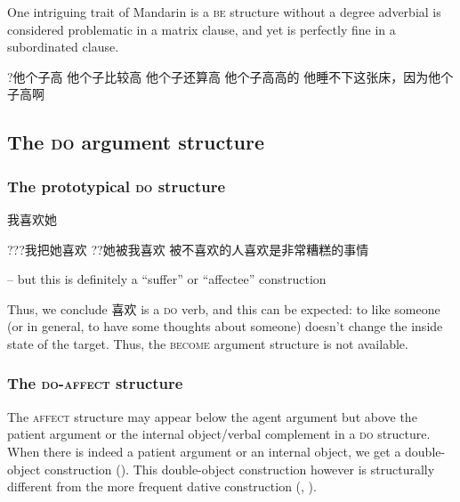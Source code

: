 \documentclass[UTF8, a4paper, oneside, scheme=plain, 12pt]{ctexrep}
\newcommand*{\category}[1]{\textsc{#1}}
\begin{document}
One intriguing trait of Mandarin is a \category{be} structure 
without a degree adverbial is considered problematic
in a matrix clause,
and yet is perfectly fine in a subordinated clause.

\begin{exe}
    \ex ?他个子高
    \ex 他个子比较高
    \ex 他个子还算高
    \ex 他个子高高的
    \ex 他睡不下这张床，因为他个子高啊
\end{exe}

\subsection{The \category{do} argument structure}\label{sec:verb-phrase.do}

\subsubsection{The prototypical \category{do} structure}\label{sec:verb-phrase.do.standard}

\begin{exe}
    \ex 我喜欢她
    \ex 
    \begin{xlist}
        \ex\label{ex:vp.do.standard.ba-1} ???我把她喜欢
        \ex ??她被我喜欢
        \ex 被不喜欢的人喜欢是非常糟糕的事情
    \end{xlist}
\end{exe}

 -- but this is definitely a ``suffer'' or ``affectee'' construction

Thus, we conclude 喜欢 is a \category{do} verb, 
and this can be expected: 
to like someone (or in general, to have some thoughts about someone) 
doesn't change the inside state of the target.
Thus, the \category{become} argument structure is not available. 

\subsubsection{The \category{do}-\category{affect} structure}\label{sec:verb-phrase.do.affect}

The \category{affect} structure may appear 
below the agent argument 
but above the patient argument or the internal object/verbal complement 
in a \category{do} structure.
When there is indeed a patient argument 
or an internal object, 
we get a double-object construction 
().
This double-object construction however 
is structurally different from the more frequent 
dative construction 
(,
).
\end{document}
